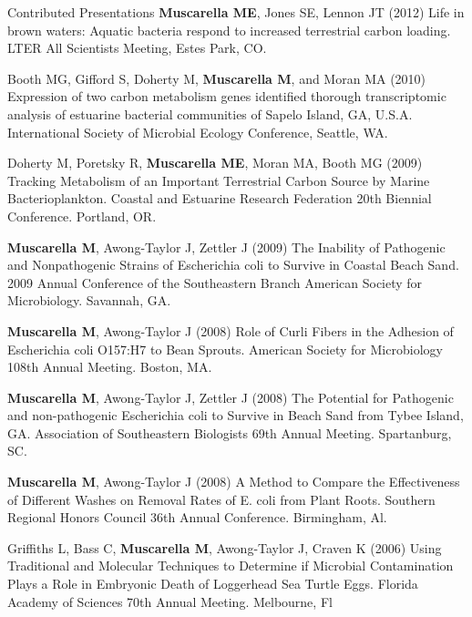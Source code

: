 \documentclass{resume} %
\begin{document}
\begin{rSection}{Contributed Presentations}
  {\bf Muscarella ME}, Jones SE, Lennon JT (2012) Life in brown waters: Aquatic
  bacteria respond to increased terrestrial carbon loading. LTER All Scientists
  Meeting, Estes Park, CO.

  Booth MG, Gifford S, Doherty M, {\bf Muscarella M}, and Moran MA (2010)
  Expression of two carbon metabolism genes identified thorough transcriptomic
  analysis of estuarine bacterial communities of Sapelo Island, GA, U.S.A.
  International Society of Microbial Ecology Conference, Seattle, WA.

  Doherty M, Poretsky R, {\bf Muscarella ME}, Moran MA, Booth MG (2009) Tracking
  Metabolism of an Important Terrestrial Carbon Source by Marine
  Bacterioplankton. Coastal and Estuarine Research Federation 20th Biennial
  Conference. Portland, OR.

  {\bf Muscarella M}, Awong-Taylor J, Zettler J (2009) The Inability of
  Pathogenic and Nonpathogenic Strains of Escherichia coli to Survive in Coastal
  Beach Sand. 2009 Annual Conference of the Southeastern Branch American Society
  for Microbiology. Savannah, GA.

  {\bf Muscarella M}, Awong-Taylor J (2008) Role of Curli Fibers in the Adhesion
  of Escherichia coli O157:H7 to Bean Sprouts. American Society for Microbiology
  108th Annual Meeting. Boston, MA.

  {\bf Muscarella M}, Awong-Taylor J, Zettler J (2008) The Potential for
  Pathogenic and non-pathogenic Escherichia coli to Survive in Beach Sand from
  Tybee Island, GA. Association of Southeastern Biologists 69th Annual Meeting.
  Spartanburg, SC.

  {\bf Muscarella M}, Awong-Taylor J (2008) A Method to Compare the
  Effectiveness of Different Washes on Removal Rates of E. coli from Plant
  Roots. Southern Regional Honors Council 36th Annual Conference. Birmingham,
  Al.

  Griffiths L, Bass  C, {\bf Muscarella M}, Awong-Taylor J, Craven K (2006)
  Using Traditional and Molecular Techniques to Determine if Microbial
  Contamination Plays a Role in Embryonic Death of Loggerhead Sea Turtle Eggs.
  Florida Academy of Sciences 70th Annual Meeting. Melbourne, Fl

\end{rSection}
\end{document}
